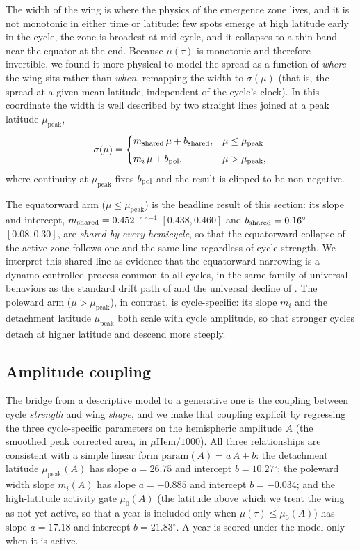 \documentclass[twocolumn]{aastex631}
\newcommand{\degr}{\ensuremath{^{\circ}}}
\newcommand{\msh}{\ensuremath{\mu\mathrm{Hem}}}   %
\newcommand{\mupeak}{\ensuremath{\mu_{\mathrm{peak}}}}
\newcommand{\muzero}{\ensuremath{\mu_0}}
\begin{document}
The width of the wing is where the physics of the emergence zone lives, and it
is not monotonic in either time or latitude: few spots emerge at high latitude
early in the cycle, the zone is broadest at mid-cycle, and it collapses to a thin
band near the equator at the end. Because $\mu(\tau)$ is monotonic and therefore
invertible, we found it more physical to model the spread as a function of
\emph{where} the wing sits rather than \emph{when}, remapping the width to
$\sigma(\mu)$ (that is, the spread at a given mean latitude, independent of the
cycle's clock). In this coordinate the width is well described by two straight
lines joined at a peak latitude \mupeak,
%
\begin{equation}
  \sigma(\mu) =
  \begin{cases}
    m_{\rm shared}\,\mu + b_{\rm shared}, & \mu \leq \mupeak \\[4pt]
    m_i\,\mu + b_{\rm pol}, & \mu > \mupeak,
  \end{cases}
  \label{eq:sigma}
\end{equation}
%
where continuity at \mupeak{} fixes $b_{\rm pol}$ and the result is clipped to be
non-negative.

The equatorward arm ($\mu \leq \mupeak$) is the headline result of this section:
its slope and intercept, $m_{\rm shared} = 0.452$~$\degr\,\degr^{-1}$
$[0.438, 0.460]$ and $b_{\rm shared} = 0.16\degr$ $[0.08, 0.30]$, are
\emph{shared by every hemicycle}, so that the equatorward collapse of the active
zone follows one and the same line regardless of cycle strength. We interpret
this shared line as evidence that the equatorward narrowing is a
dynamo-controlled process common to all cycles, in the same family of universal
behaviors as the standard drift path of \citet[CIT]{Hathaway2011} and the
universal decline of \citet[CIT]{CameronSchussler2016}. The poleward arm ($\mu >
\mupeak$), in contrast, is cycle-specific: its slope $m_i$ and the detachment
latitude \mupeak{} both scale with cycle amplitude, so that stronger cycles
detach at higher latitude and descend more steeply.

\subsection{Amplitude coupling}
\label{sec:amplitude}

The bridge from a descriptive model to a generative one is the coupling between
cycle \emph{strength} and wing \emph{shape}, and we make that coupling explicit
by regressing the three cycle-specific parameters on the hemispheric amplitude
$A$ (the smoothed peak corrected area, in $\msh/1000$). All three relationships
are consistent with a simple linear form $\mathrm{param}(A) = a\,A + b$: the
detachment latitude $\mupeak(A)$ has slope $a=26.75$ and intercept $b=10.27\degr$;
the poleward width slope $m_i(A)$ has slope $a=-0.885$ and intercept $b=-0.034$;
and the high-latitude activity gate $\muzero(A)$ (the latitude above which we
treat the wing as not yet active, so that a year is included only when
$\mu(\tau) \leq \muzero(A)$) has slope $a=17.18$ and intercept $b=21.83\degr$. A
year is scored under the model only when it is active.
\end{document}
